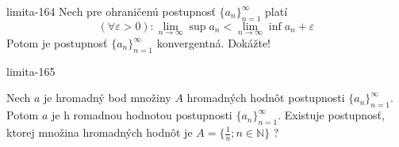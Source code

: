 \begin{defproblem}{limita-164}
Nech pre ohraničenú postupnosť ${\{a_n\}}_{n=1}^\infty$ platí
\[
    (\forall \varepsilon > 0):
    \lim\limits_{n \rightarrow \infty} \sup a_n
    <
    \lim\limits_{n \rightarrow \infty} \inf a_n+\varepsilon
\]
Potom je postupnosť ${\{a_n\}}_{n=1}^\infty$
konvergentná. Dokážte!
\end{defproblem}

\begin{defproblem}{limita-165}
\begin{tasks}
\task
    Nech $a$ je hromadný bod množiny $A$ hromadných hodnôt postupnosti
    ${\{a_n\}}_{n=1}^\infty$. Potom $a$ je h romadnou hodnotou postupnosti
    ${\{a_n\}}_{n=1}^\infty$.
\task
    Existuje postupnosť, ktorej množina hromadných hodnôt je $A=\{ \frac{1}{n};
    n \in \mathbb{N} \}$ ?
\end{tasks}
\end{defproblem}

